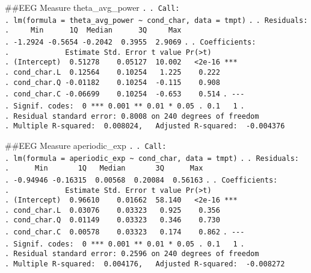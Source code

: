 \documentclass[
]{article}
\begin{document}
\#\#EEG Measure theta\_avg\_power \texttt{.} \texttt{.\ Call:}
\texttt{.\ lm(formula\ =\ theta\_avg\_power\ \textasciitilde{}\ cond\_char,\ data\ =\ tmpt)}
\texttt{.} \texttt{.\ Residuals:}
\texttt{.\ \ \ \ \ Min\ \ \ \ \ \ 1Q\ \ Median\ \ \ \ \ \ 3Q\ \ \ \ \ Max}
\texttt{.\ -1.2924\ -0.5654\ -0.2042\ \ 0.3955\ \ 2.9069} \texttt{.}
\texttt{.\ Coefficients:}
\texttt{.\ \ \ \ \ \ \ \ \ \ \ \ \ Estimate\ Std.\ Error\ t\ value\ Pr(\textgreater{}\textbar{}t\textbar{})}
\texttt{.\ (Intercept)\ \ 0.51278\ \ \ \ 0.05127\ \ 10.002\ \ \ \textless{}2e-16\ ***}
\texttt{.\ cond\_char.L\ \ 0.12564\ \ \ \ 0.10254\ \ \ 1.225\ \ \ \ 0.222}
\texttt{.\ cond\_char.Q\ -0.01182\ \ \ \ 0.10254\ \ -0.115\ \ \ \ 0.908}
\texttt{.\ cond\_char.C\ -0.06699\ \ \ \ 0.10254\ \ -0.653\ \ \ \ 0.514}
\texttt{.\ -\/-\/-}
\texttt{.\ Signif.\ codes:\ \ 0\ \textquotesingle{}***\textquotesingle{}\ 0.001\ \textquotesingle{}**\textquotesingle{}\ 0.01\ \textquotesingle{}*\textquotesingle{}\ 0.05\ \textquotesingle{}.\textquotesingle{}\ 0.1\ \textquotesingle{}\ \textquotesingle{}\ 1}
\texttt{.}
\texttt{.\ Residual\ standard\ error:\ 0.8008\ on\ 240\ degrees\ of\ freedom}
\texttt{.\ Multiple\ R-squared:\ \ 0.008024,\ \ \ Adjusted\ R-squared:\ \ -0.004376}

\#\#EEG Measure aperiodic\_exp \texttt{.} \texttt{.\ Call:}
\texttt{.\ lm(formula\ =\ aperiodic\_exp\ \textasciitilde{}\ cond\_char,\ data\ =\ tmpt)}
\texttt{.} \texttt{.\ Residuals:}
\texttt{.\ \ \ \ \ \ Min\ \ \ \ \ \ \ 1Q\ \ \ Median\ \ \ \ \ \ \ 3Q\ \ \ \ \ \ Max}
\texttt{.\ -0.94946\ -0.16315\ \ 0.00568\ \ 0.20084\ \ 0.56163}
\texttt{.} \texttt{.\ Coefficients:}
\texttt{.\ \ \ \ \ \ \ \ \ \ \ \ \ Estimate\ Std.\ Error\ t\ value\ Pr(\textgreater{}\textbar{}t\textbar{})}
\texttt{.\ (Intercept)\ \ 0.96610\ \ \ \ 0.01662\ \ 58.140\ \ \ \textless{}2e-16\ ***}
\texttt{.\ cond\_char.L\ \ 0.03076\ \ \ \ 0.03323\ \ \ 0.925\ \ \ \ 0.356}
\texttt{.\ cond\_char.Q\ \ 0.01149\ \ \ \ 0.03323\ \ \ 0.346\ \ \ \ 0.730}
\texttt{.\ cond\_char.C\ \ 0.00578\ \ \ \ 0.03323\ \ \ 0.174\ \ \ \ 0.862}
\texttt{.\ -\/-\/-}
\texttt{.\ Signif.\ codes:\ \ 0\ \textquotesingle{}***\textquotesingle{}\ 0.001\ \textquotesingle{}**\textquotesingle{}\ 0.01\ \textquotesingle{}*\textquotesingle{}\ 0.05\ \textquotesingle{}.\textquotesingle{}\ 0.1\ \textquotesingle{}\ \textquotesingle{}\ 1}
\texttt{.}
\texttt{.\ Residual\ standard\ error:\ 0.2596\ on\ 240\ degrees\ of\ freedom}
\texttt{.\ Multiple\ R-squared:\ \ 0.004176,\ \ \ Adjusted\ R-squared:\ \ -0.008272}
\end{document}
